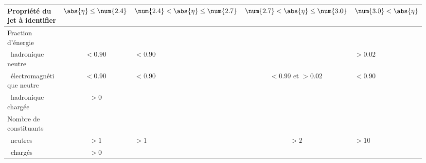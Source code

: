 \begin{tabularx}{\textwidth}{lcYcY}
\toprule
Propriété du jet à identifier & $\abs{\eta}\leq\num{2.4}$ & $\num{2.4}<\abs{\eta}\leq\num{2.7}$ & $\num{2.7}<\abs{\eta}\leq\num{3.0}$ & $\num{3.0}<\abs{\eta}$ \\
\midrule
Fraction d'énergie\\
\ hadronique neutre & $<\num{0.90}$ & $<\num{0.90}$ &  & $>\num{0.02}$ \\
\ électromagnétique neutre & $<\num{0.90}$ & $<\num{0.90}$ & $<\num{0.99}$ et $>\num{0.02}$ & $<\num{0.90}$ \\
\ hadronique chargée & $>\num{0}$ &&&\\
\midrule
Nombre de constituants\\
\ neutres & $>\num{1}$ & $>\num{1}$ & $>\num{2}$ & $>\num{10}$ \\
\ chargés & $>\num{0}$ &&&\\
\bottomrule
\end{tabularx}
